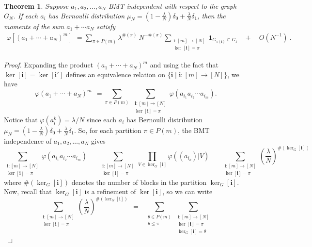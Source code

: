 \documentclass[a4paper,12pt]{extarticle}
\newtheorem{thm}{Theorem}[section]
\theoremstyle{definition}
\theoremstyle{remark}
\begin{document}
\begin{thm}\label{thm_poisson}
	Suppose $a_1, a_2, \ldots, a_N$ BMT independent with respect to the graph $G_N$. If each $a_i$ has Bernoulli distribution $\mu_N = (1-\frac{\lambda}{N})\delta_0 + \frac{\lambda}{N} \delta_{1} $, then the moments of the sum $a_1+\cdots a_N$ satisfy
	\begin{eqnarray*}
		\varphi\left[ \left( a_1+\cdots+a_N  \right)_{}^m\right]
		\ \, =
		\sum_{\pi \in P(m)}  
		\lambda^{\#(\pi)}  \ N^{-\#(\pi)}
		\sum_{\substack{ {\bm i}:[m]\rightarrow [N] \\ \ker[{\bm i}]=\pi}}  
		\bm{1}_{G_{\pi(\bm{i})}  \subseteq G_{\bm i}}  
		\quad	+ \quad O(N^{-1}) \ . 
	\end{eqnarray*} 
\end{thm}
\begin{proof}
	Expanding the product $(a_1 + \cdots + a_N)^m$ and using the fact that  $\ker[\bm{i}] = \ker[\bm{i'}]$ defines an equivalence relation on $\{ \bm{i} \mid \bm{i}: [m]\to [N]\}$, we have
	\[
	\varphi	( {a_1 + \cdots + a_N} )^m
	\ \ = 
	\sum_{\pi \in P(m)}  \ 
	\sum_{\substack{ {\bm i}:[m]\rightarrow [N] \\ \ker[{\bm i}]=\pi}}  
	\varphi( a_{i_1} a_{i_2} \cdots a_{i_m} ).
	\]
	Notice that $\varphi(a^k_i) =\lambda/N$ since each $a_i$ has Bernoulli distribution $\mu_N = (1-\frac{\lambda}{N})\delta_0 + \frac{\lambda}{N} \delta_{1}$. 
	So, for each partition $\pi \in P(m)$, the BMT independence of $a_1,a_2,\ldots,a_N$  gives  
	\[
	\sum_{\substack{ {\bm i}:[m]\rightarrow [N] \\ \ker[{\bm i}]=\pi}}  
	\varphi( a_{i_1} a_{i_2} \cdots a_{i_m} )
	\ \ = \sum_{\substack{ {\bm i}:[m]\rightarrow [N] \\ \ker[{\bm i}]=\pi}}  	\prod_{V \in \ker_G[\bm{i}]} \varphi((a_{i_k})|V)
	\ \ =
	\sum_{\substack{ {\bm i}:[m]\rightarrow [N] \\ \ker[{\bm i}]=\pi}}  
	\left(\frac{\lambda}{N}\right)^{\# (\ker_G[\bm{i}])}			
	\]
	where $\# (\ker_G[\bm{i}])$ denotes the number of blocks in the partition $\ker_G[\bm{i}]$. 
	Now, recall that $\ker_G[\bm{i}]$ is a refinement of $\ker[{\bm i}]$, so we can write    
	\[
	\sum_{\substack{ {\bm i}:[m]\rightarrow [N] \\ \ker[{\bm i}]=\pi}}  
	\left(\frac{\lambda}{N}\right)^{\# (\ker_G[\bm{i}])}
	\ \ = \ \ \  
	\sum_{\substack{ \theta \in P(m) \\ \theta \leq \pi } }
	\sum_{\substack{ {\bm i}:[m]\rightarrow [N] \\ \ker[\bm{i}]=\pi \\ \ker_G[\bm{i}] = \theta}} 
\]
\end{proof}
\end{document}
